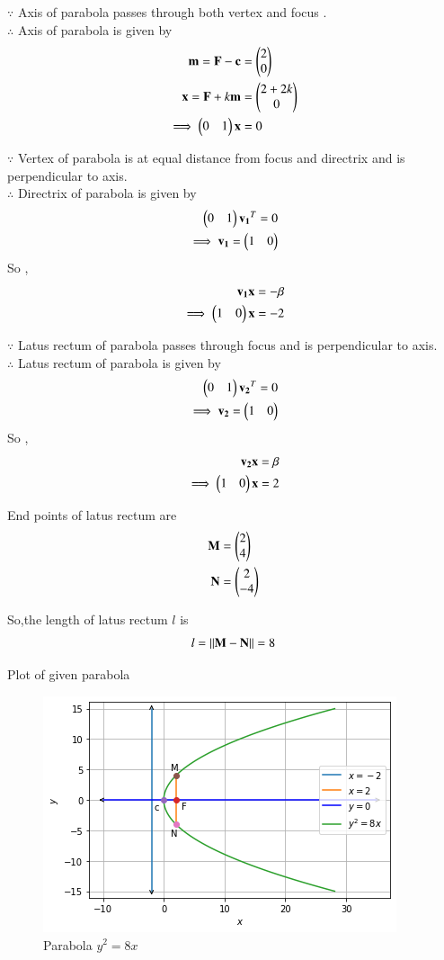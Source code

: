 \documentclass[journal,12pt,twocolumn]{IEEEtran}
\begin{document}
$\because$
Axis of parabola passes through both vertex and focus .
\\
$\therefore$
Axis of parabola is given by
\begin{align}
\mathbf{m} =\mathbf{F} - \mathbf{c} &= \begin{pmatrix}2\\0\end{pmatrix}
\\
\mathbf{x} = \mathbf{F} + k\mathbf{m} &= \begin{pmatrix}2+2k \\ 0\end{pmatrix}
\\
\implies \begin{pmatrix}0 & 1\end{pmatrix}\mathbf{x} &= 0
\end{align}

$\because$
Vertex of parabola is at equal distance from focus and directrix and is perpendicular to axis.
\\
$\therefore$
Directrix of parabola is given by
\begin{align}
\begin{pmatrix}0 & 1\end{pmatrix}\mathbf{v_1}^T = 0
\\
\implies \mathbf{v_1} = \begin{pmatrix}1 & 0\end{pmatrix}
\end{align}
So , 
\begin{align}
\mathbf{v_1}\mathbf{x} = -\beta
\\
\implies \begin{pmatrix}1 & 0\end{pmatrix}\mathbf{x} = -2
\end{align}

$\because$
Latus rectum of parabola passes through focus and is perpendicular to axis.
\\
$\therefore$
Latus rectum of parabola is given by
\begin{align}
\begin{pmatrix}0 & 1\end{pmatrix}\mathbf{v_2}^T = 0
\\
\implies \mathbf{v_2} = \begin{pmatrix}1 & 0\end{pmatrix}
\end{align}
So , 
\begin{align}
\mathbf{v_2}\mathbf{x} = \beta
\\
\implies \begin{pmatrix}1 & 0\end{pmatrix}\mathbf{x} = 2
\end{align}

End points of latus rectum are
\begin{align}
\mathbf{M} &= \begin{pmatrix}2\\4\end{pmatrix}
\\
\mathbf{N} &= \begin{pmatrix}2\\-4\end{pmatrix}
\end{align}

So,the length of latus rectum $l$ is 
\begin{align}
l = \left\lVert\mathbf{M}-\mathbf{N}\right\rVert = 8
\end{align}

\newpage
Plot of given parabola

\begin{figure}[!ht]
\centering
\includegraphics[width=\columnwidth]{Figure6}
\caption{Parabola $y^2=8x$ }
\label{fig:parabola}	
\end{figure}
\end{document}
